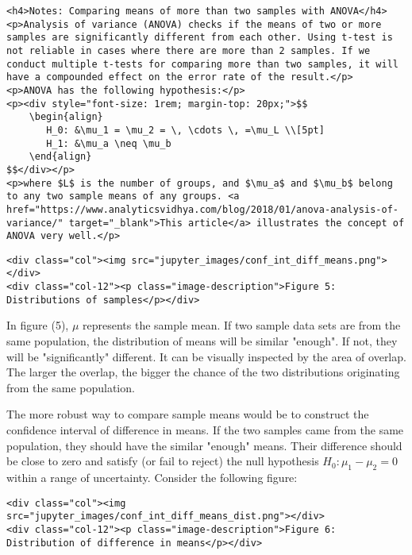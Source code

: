 \documentclass[11pt]{article}
\begin{document}
\begin{verbatim}
<h4>Notes: Comparing means of more than two samples with ANOVA</h4>
<p>Analysis of variance (ANOVA) checks if the means of two or more samples are significantly different from each other. Using t-test is not reliable in cases where there are more than 2 samples. If we conduct multiple t-tests for comparing more than two samples, it will have a compounded effect on the error rate of the result.</p>
<p>ANOVA has the following hypothesis:</p>
<p><div style="font-size: 1rem; margin-top: 20px;">$$
    \begin{align}
       H_0: &\mu_1 = \mu_2 = \, \cdots \, =\mu_L \\[5pt]
       H_1: &\mu_a \neq \mu_b
    \end{align}
$$</div></p>
<p>where $L$ is the number of groups, and $\mu_a$ and $\mu_b$ belong to any two sample means of any groups. <a href="https://www.analyticsvidhya.com/blog/2018/01/anova-analysis-of-variance/" target="_blank">This article</a> illustrates the concept of ANOVA very well.</p>
\end{verbatim}

    \hypertarget{fig5}{}
\begin{verbatim}
<div class="col"><img src="jupyter_images/conf_int_diff_means.png"></div>
<div class="col-12"><p class="image-description">Figure 5: Distributions of samples</p></div>
\end{verbatim}

In figure (5), \(\mu\) represents the sample mean. If two sample data
sets are from the same population, the distribution of means will be
similar "enough". If not, they will be "significantly" different. It can
be visually inspected by the area of overlap. The larger the overlap,
the bigger the chance of the two distributions originating from the same
population.

The more robust way to compare sample means would be to construct the
confidence interval of difference in means. If the two samples came from
the same population, they should have the similar "enough" means. Their
difference should be close to zero and satisfy (or fail to reject) the
null hypothesis {\(H_0: \mu_1 - \mu_2 = 0\)} within a range of
uncertainty. Consider the following figure:

\hypertarget{fig6}{}
\begin{verbatim}
<div class="col"><img src="jupyter_images/conf_int_diff_means_dist.png"></div>
<div class="col-12"><p class="image-description">Figure 6: Distribution of difference in means</p></div>
\end{verbatim}
\end{document}
